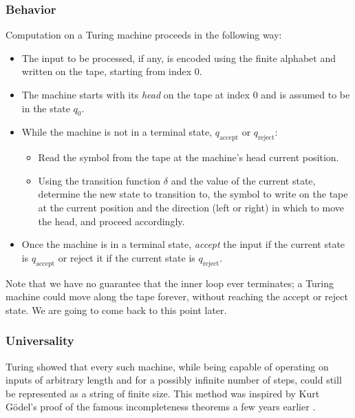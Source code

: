 \subsubsection{Behavior}

Computation on a Turing machine proceeds in the following way:
\begin{itemize}
    \item The input to be processed, if any, is encoded using the finite alphabet and written on the tape, starting from index \(0\).

    \item The machine starts with its \emph{head} on the tape at index \(0\) and is assumed to be in the state \(q_0\).

    \item While the machine is not in a terminal state, \(q_{\text{accept}}\) or \(q_{\text{reject}}\):
    \begin{itemize}
        \item Read the symbol from the tape at the machine's head current position.
        
        \item Using the transition function \(\delta\) and the value of the current state, determine the new state to transition to, the symbol to write on the tape at the current position and the direction (left or right) in which to move the head, and proceed accordingly.
    \end{itemize}

    \item Once the machine is in a terminal state, \emph{accept} the input if the current state is \(q_{\text{accept}}\) or reject it if the current state is \(q_{\text{reject}}\).
\end{itemize}

Note that we have no guarantee that the inner loop ever terminates; a Turing machine could move along the tape forever, without reaching the accept or reject state. We are going to come back to this point later.

\subsubsection{Universality}

Turing showed that every such machine, while being capable of operating on inputs of arbitrary length and for a possibly infinite number of steps, could still be represented as a string of finite size. This method was inspired by Kurt Gödel's proof of the famous incompleteness theorems a few years earlier \cite{Gödel1931}.

